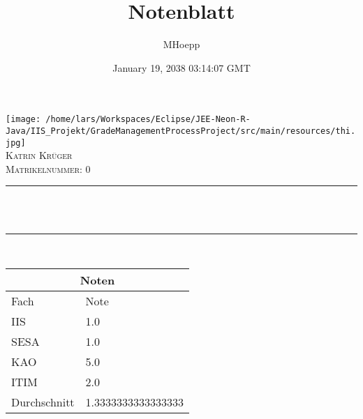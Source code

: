 \documentclass[12pt]{article}
\title{Notenblatt}
\author{MHoepp}
\date{January 19, 2038 03:14:07 GMT}
\makeatletter
\let\thetitle\@title
\makeatother
\begin{document}
   
   
    \begin{titlepage}
        \centering
        \texttt{[image: /home/lars/Workspaces/Eclipse/JEE-Neon-R-Java/IIS\_Projekt/GradeManagementProcessProject/src/main/resources/thi.jpg]}\\[0.5 cm] 
        \textsc{\Large Katrin Krüger}\\[1.0 cm] %
        \textsc{Matrikelnummer: 0}\\[0.25 cm]               %
        \rule{\linewidth}{0.2 mm} \\[0.2 cm]
        { \huge \bfseries \thetitle}\\
        \rule{\linewidth}{0.2 mm} \\[0.75 cm]
       
       
       
        \setlength{\arrayrulewidth}{1mm}
        \setlength{\tabcolsep}{12pt}
        \renewcommand{\arraystretch}{2.5}
        {
            \begin{tabular}{ |p{5cm}|p{1.5cm}|  }
                \hline
                \multicolumn{2}{|c|}{Noten} \\
                \hline
                Fach& Note  \\
                \hline
IIS & 1.0\\

SESA & 1.0\\

KAO & 5.0\\

ITIM & 2.0\\


               
               
               
                \hline
                Durchschnitt & 1.3333333333333333  \\
                \hline
            \end{tabular}
        }
       
       
       
       
       
       
       
    \end{titlepage}
   
   
   
\end{document}
